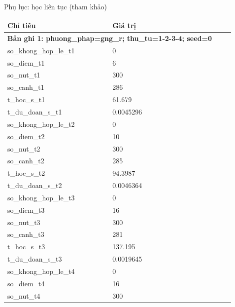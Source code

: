 \par\smallskip\noindent Phụ lục: học liên tục (tham khảo)\par
\begin{longtable}{p{0.43\linewidth}p{0.50\linewidth}}
\toprule Chỉ tiêu & Giá trị \\ \midrule \endhead
\multicolumn{2}{p{0.95\linewidth}}{\textbf{Bản ghi 1: phuong\_phap=gng\_r; thu\_tu=1-2-3-4; seed=0}} \\
so\_\allowbreak khong\_\allowbreak hop\_\allowbreak le\_\allowbreak t1 & 0 \\
so\_\allowbreak diem\_\allowbreak t1 & 6 \\
so\_\allowbreak nut\_\allowbreak t1 & 300 \\
so\_\allowbreak canh\_\allowbreak t1 & 286 \\
t\_\allowbreak hoc\_\allowbreak s\_\allowbreak t1 & 61.679 \\
t\_\allowbreak du\_\allowbreak doan\_\allowbreak s\_\allowbreak t1 & 0.0045296 \\
so\_\allowbreak khong\_\allowbreak hop\_\allowbreak le\_\allowbreak t2 & 0 \\
so\_\allowbreak diem\_\allowbreak t2 & 10 \\
so\_\allowbreak nut\_\allowbreak t2 & 300 \\
so\_\allowbreak canh\_\allowbreak t2 & 285 \\
t\_\allowbreak hoc\_\allowbreak s\_\allowbreak t2 & 94.3987 \\
t\_\allowbreak du\_\allowbreak doan\_\allowbreak s\_\allowbreak t2 & 0.0046364 \\
so\_\allowbreak khong\_\allowbreak hop\_\allowbreak le\_\allowbreak t3 & 0 \\
so\_\allowbreak diem\_\allowbreak t3 & 16 \\
so\_\allowbreak nut\_\allowbreak t3 & 300 \\
so\_\allowbreak canh\_\allowbreak t3 & 281 \\
t\_\allowbreak hoc\_\allowbreak s\_\allowbreak t3 & 137.195 \\
t\_\allowbreak du\_\allowbreak doan\_\allowbreak s\_\allowbreak t3 & 0.0019645 \\
so\_\allowbreak khong\_\allowbreak hop\_\allowbreak le\_\allowbreak t4 & 0 \\
so\_\allowbreak diem\_\allowbreak t4 & 16 \\
so\_\allowbreak nut\_\allowbreak t4 & 300 \\

\end{longtable}
